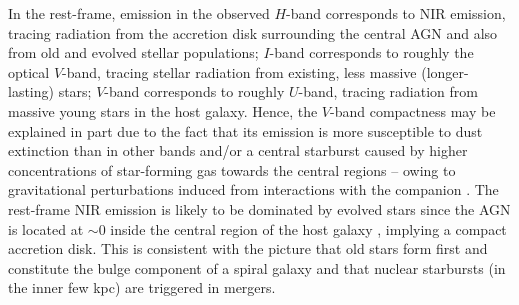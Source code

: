 \documentclass[]{emulateapj}
\begin{document}
In the rest-frame, 
emission in the observed $H$-band corresponds to NIR emission, 
tracing radiation from the accretion disk surrounding
the central AGN and also from old and evolved stellar populations; 
$I$-band corresponds to roughly the optical $V$-band, tracing stellar radiation from
existing, less massive (\ie longer-lasting) stars;
$V$-band corresponds to roughly $U$-band,  tracing radiation from massive young stars 
in the host galaxy. Hence,
the $V$-band compactness may be explained in part
due to the fact that its emission is
more susceptible to dust extinction than in other bands and/or 
a central starburst caused by higher 
concentrations of star-forming gas towards the central regions -- owing to
gravitational perturbations induced
from interactions with the companion
\citep[\eg][]{DiMatteo05a}.
The rest-frame NIR emission is likely to be
dominated by evolved stars since 
the AGN is located at $\sim$0 inside the central region %
of the host galaxy \citep{Sluse06a}, implying a compact accretion disk. 
This is consistent with the picture that old stars form first and constitute the bulge component  
of a spiral galaxy and that nuclear starbursts (in the inner few kpc) are triggered in mergers.
\end{document}
